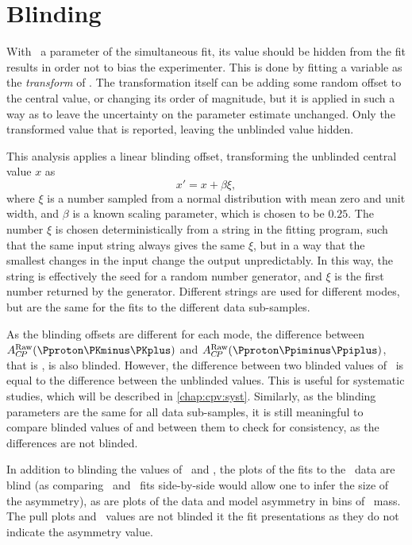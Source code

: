 \section{Blinding}
\label{chap:cpv:araw:blinding}

With \ARaw\ a parameter of the simultaneous fit, its value should be hidden 
from the fit results in order not to bias the experimenter.
This is done by fitting a variable as the \emph{transform} of \ARaw.
The transformation itself can be adding some random offset to the central 
value, or changing its order of magnitude, but it is applied in such a way as 
to leave the uncertainty on the parameter estimate unchanged.
Only the transformed value that is reported, leaving the unblinded value 
hidden.

This analysis applies a linear blinding offset, transforming the unblinded 
central value $x$ as
\begin{equation}
  x' = x + \beta\xi,
\end{equation}
where $\xi$ is a number sampled from a normal distribution with mean zero and 
unit width, and $\beta$ is a known scaling parameter, which is chosen to be 
$0.25$.
The number $\xi$ is chosen deterministically from a string in the fitting 
program, such that the same input string always gives the same $\xi$, but in a 
way that the smallest changes in the input change the output unpredictably.
In this way, the string is effectively the seed for a random number generator, 
and $\xi$ is the first number returned by the generator.
Different strings are used for different modes, but are the same for the fits 
to the different data sub-samples.

As the blinding offsets are different for each mode, the difference between 
$\ARaw(\pKK)$ and $\ARaw(\ppipi)$, that is \dACP, is also blinded.
However, the difference between two blinded values of \dACP\ is equal to the 
difference between the unblinded values.
This is useful for systematic studies, which will be described in 
\cref{chap:cpv:syst}.
Similarly, as the blinding parameters are the same for all data sub-samples, it 
is still meaningful to compare blinded values of \ARaw and \dACP between them 
to check for consistency, as the differences are not blinded.

In addition to blinding the values of \ARaw\ and \dACP, the plots of the fits 
to the \APLambdac\ data are blind (as comparing \PLambdac\ and \APLambdac\ fits 
side-by-side would allow one to infer the size of the asymmetry), as are plots 
of the data and model asymmetry in bins of \PLambdac\ mass.
The pull plots and \chisq\ values are not blinded it the fit presentations as 
they do not indicate the asymmetry value.

